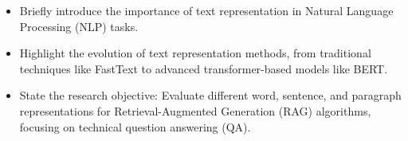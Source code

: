 
\begin{itemize}
  \item Briefly introduce the importance of text representation in Natural Language Processing (NLP) tasks.
  \item Highlight the evolution of text representation methods, from traditional techniques like FastText to advanced transformer-based models like BERT.
  \item State the research objective: Evaluate different word, sentence, and paragraph representations for Retrieval-Augmented Generation (RAG) algorithms, focusing on technical question answering (QA).
\end{itemize}

